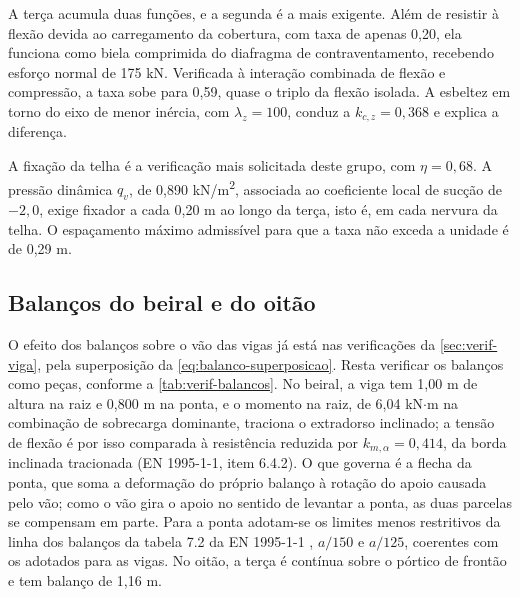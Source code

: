 A terça acumula duas funções, e a segunda é a mais exigente. Além de resistir à
flexão devida ao carregamento da cobertura, com taxa de apenas 0,20, ela
funciona como biela comprimida do diafragma de contraventamento, recebendo
esforço normal de 175 kN. Verificada à interação combinada de flexão e
compressão, a taxa sobe para 0,59, quase o triplo da flexão isolada. A
esbeltez em torno do eixo de menor inércia, com $\lambda_z = 100$, conduz a
$k_{c,z} = 0{,}368$ e explica a diferença.

A fixação da telha é a verificação mais solicitada deste grupo, com
$\eta = 0{,}68$. A pressão dinâmica $q_v$, de 0,890 kN/m\textsuperscript{2}, associada
ao coeficiente local de sucção de $-2{,}0$, exige fixador a cada 0,20 m ao longo
da terça, isto é, em cada nervura da telha. O espaçamento máximo admissível para
que a taxa não exceda a unidade é de 0,29 m.


\subsection{Balanços do beiral e do oitão}\label{ssec:verif-balancos}

O efeito dos balanços sobre o vão das vigas já está nas verificações da
\autoref{sec:verif-viga}, pela superposição da \autoref{eq:balanco-superposicao}.
Resta verificar os balanços como peças, conforme a
\autoref{tab:verif-balancos}. No beiral, a viga tem 1,00 m de altura na raiz e
0,800 m na ponta, e o momento na raiz, de 6,04 kN$\cdot$m na combinação de
sobrecarga dominante, traciona o extradorso inclinado; a tensão de flexão é por
isso comparada à resistência reduzida por $k_{m,\alpha} = 0{,}414$, da borda
inclinada tracionada (EN 1995-1-1, item 6.4.2). O que governa é a flecha da
ponta, que soma a deformação do próprio balanço à rotação do apoio causada pelo
vão; como o vão gira o apoio no sentido de levantar a ponta, as duas parcelas
se compensam em parte. Para a ponta adotam-se os limites menos restritivos da
linha dos balanços da tabela 7.2 da EN 1995-1-1 \cite{EN1995-1-1:2004},
$a/150$ e $a/125$, coerentes com os adotados para as vigas. No oitão, a terça é
contínua sobre o pórtico de frontão e tem balanço de 1,16 m.

